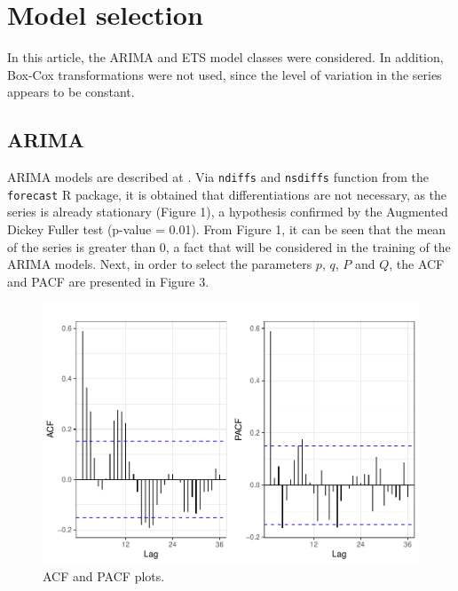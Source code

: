 \documentclass{statsoc}
\begin{document}
\hypertarget{model-selection}{%
\section{Model selection}\label{model-selection}}

In this article, the ARIMA and ETS model classes were considered. In
addition, Box-Cox transformations were not used, since the level of
variation in the series appears to be constant.

\hypertarget{arima}{%
\subsection{ARIMA}\label{arima}}

ARIMA models are described at \citet{morettin2006}. Via \texttt{ndiffs}
and \texttt{nsdiffs} function from the \texttt{forecast} R package, it
is obtained that differentiations are not necessary, as the series is
already stationary (Figure 1), a hypothesis confirmed by the Augmented
Dickey Fuller test (p-value = 0.01). From Figure 1, it can be seen that
the mean of the series is greater than 0, a fact that will be considered
in the training of the ARIMA models. Next, in order to select the
parameters \(p\), \(q\), \(P\) and \(Q\), the ACF and PACF are presented
in Figure 3.

\begin{figure}

{\centering \includegraphics[height=0.4\textheight]{Trabalho_2_article_files/figure-latex/acf-pacf-1} 

}

\caption{ACF and PACF plots.}\label{fig:acf-pacf}
\end{figure}
\end{document}
